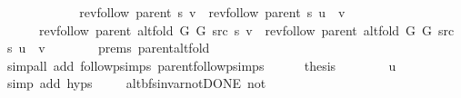 \begin{isabellebody}
\ \ \ \ \isamarkupfalse%
\ \isamarkupfalse%
\isanewline
\ \ \ \ \ \ {\isachardoublequoteopen}rev{\isacharunderscore}{\kern0pt}follow\ {\isacharparenleft}{\kern0pt}parent\ s{\isacharparenright}{\kern0pt}\ v\ {\isacharequal}{\kern0pt}\ rev{\isacharunderscore}{\kern0pt}follow\ {\isacharparenleft}{\kern0pt}parent\ s{\isacharparenright}{\kern0pt}\ u\ {\isacharat}{\kern0pt}\ {\isacharbrackleft}{\kern0pt}v{\isacharbrackright}{\kern0pt}{\isachardoublequoteclose}\isanewline
\ \ \ \ \ \ {\isachardoublequoteopen}rev{\isacharunderscore}{\kern0pt}follow\ {\isacharparenleft}{\kern0pt}parent\ {\isacharparenleft}{\kern0pt}alt{\isacharunderscore}{\kern0pt}fold\ G{}\ G{}\ src\ s{\isacharparenright}{\kern0pt}{\isacharparenright}{\kern0pt}\ v\ {\isacharequal}{\kern0pt}\ rev{\isacharunderscore}{\kern0pt}follow\ {\isacharparenleft}{\kern0pt}parent\ {\isacharparenleft}{\kern0pt}alt{\isacharunderscore}{\kern0pt}fold\ G{}\ G{}\ src\ s{\isacharparenright}{\kern0pt}{\isacharparenright}{\kern0pt}\ u\ {\isacharat}{\kern0pt}\ {\isacharbrackleft}{\kern0pt}v{\isacharbrackright}{\kern0pt}{\isachardoublequoteclose}\isanewline
\ \ \ \ \ \ \isamarkupfalse%
\ {\isachardoublequoteopen}{}{\isachardot}{\kern0pt}prems{\isachardoublequoteclose}{\isacharparenleft}{\kern0pt}{}{\isacharparenright}{\kern0pt}\ parent{\isacharunderscore}{\kern0pt}alt{\isacharunderscore}{\kern0pt}fold\isanewline
\ \ \ \ \ \ \isamarkupfalse%
\ {\isacharparenleft}{\kern0pt}simp{\isacharunderscore}{\kern0pt}all\ add{\isacharcolon}{\kern0pt}\ follow{\isacharunderscore}{\kern0pt}psimps\ parent{\isachardot}{\kern0pt}follow{\isacharunderscore}{\kern0pt}psimps{\isacharparenright}{\kern0pt}\isanewline
\ \ \ \ \isamarkupfalse%
\ {\isacharquery}{\kern0pt}thesis\isanewline
\ \ \ \ \ \ \isamarkupfalse%
\ u\isanewline
\ \ \ \ \ \ \isamarkupfalse%
\ {\isacharparenleft}{\kern0pt}simp\ add{\isacharcolon}{\kern0pt}\ {\isachardoublequoteopen}{}{\isachardot}{\kern0pt}hyps{\isachardoublequoteclose}{\isacharparenright}{\kern0pt}\isanewline
\ \ \isamarkupfalse%
\isanewline
{}\isamarkupfalse%
%
\endisatagproof
{\isafoldproof}%
%
\isadelimproof
\isanewline
%
\endisadelimproof
\isanewline
{}\isamarkupfalse%
\ {\isacharparenleft}{\kern0pt}\ alt{\isacharunderscore}{\kern0pt}bfs{\isacharunderscore}{\kern0pt}invar{\isacharunderscore}{\kern0pt}not{\isacharunderscore}{\kern0pt}DONE{\isacharparenright}{\kern0pt}\ not{\isacharunderscore}{\kern0pt}\ {\isacharequal}{\kern0pt}\isanewline

\end{isabellebody}
